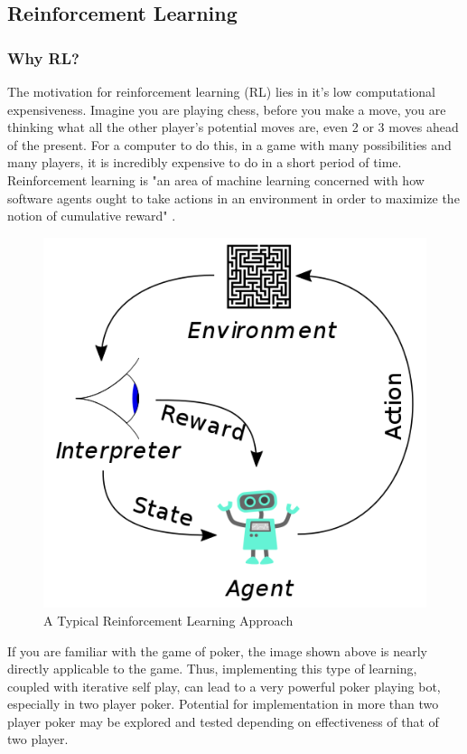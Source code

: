 \documentclass[12pt]{article}
\begin{document}
\subsection{Reinforcement Learning}
\subsubsection{Why RL?}
The motivation for reinforcement learning (RL) lies in it's low computational expensiveness. Imagine you are playing chess, before you make a move, you are thinking what all the other player's potential moves are, even 2 or 3 moves ahead of the present. For a computer to do this, in a game with many possibilities and many players, it is incredibly expensive to do in a short period of time. Reinforcement learning is "an area of machine learning concerned with how software agents ought to take actions in an environment in order to maximize the notion of cumulative reward" \cite{rl}.
\begin{figure}[H]
    \centering
    \includegraphics[width=.50\linewidth]{figures/rel.png}
    \caption{A Typical Reinforcement Learning Approach \cite{rl}}
    \label{fig:rl}
\end{figure}
If you are familiar with the game of poker, the image shown above is nearly directly applicable to the game. Thus, implementing this type of learning, coupled with iterative self play, can lead to a very powerful poker playing bot, especially in two player poker. Potential for implementation in more than two player poker may be explored and tested depending on effectiveness of that of two player.
\end{document}
